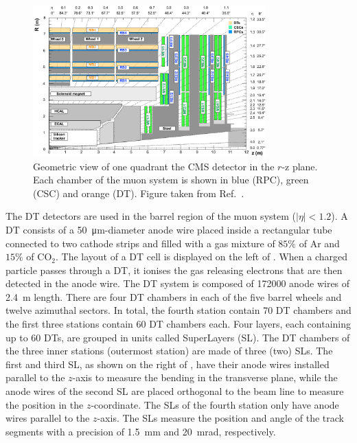 \begin{figure}[!htbp]
 \centering
 \includegraphics[width=0.8\textwidth]{Figures/Experiment/CMS/MuonSystem.png}
 \caption{Geometric view of one quadrant the CMS detector in the $r$-z plane. Each chamber of the muon system is shown in blue (RPC), green (CSC) and orange (DT). Figure taken from Ref.~\cite{CMSMuonFig}.}
 \label{fig:CMS_Muon}
\end{figure}

The DT detectors are used in the barrel region of the muon system ($|\eta| < 1.2$). A DT consists of a \SI{50}{\um}-diameter anode wire placed inside a rectangular tube connected to two cathode strips and filled with a gas mixture of $85\%$ of Ar and $15\%$ of $\text{CO}_{2}$. The layout of a DT cell is displayed on the left of . When a charged particle passes through a DT, it ionises the gas releasing electrons that are then detected in the anode wire. The DT system is composed of 172000 anode wires of \SI{2.4}{\m} length. There are four DT chambers in each of the five barrel wheels and twelve azimuthal sectors. In total, the fourth station contain 70 DT chambers and the first three stations contain 60 DT chambers each. Four layers, each containing up to 60 DTs, are grouped in units called SuperLayers (SL). The DT chambers of the three inner stations (outermost station) are made of three (two) SLs. The first and third SL, as shown on the right of , have their anode wires installed parallel to the $z$-axis to measure the bending in the transverse plane, while the anode wires of the second SL are placed orthogonal to the beam line to measure the position in the $z$-coordinate. The SLs of the fourth station only have anode wires parallel to the $z$-axis. The SLs measure the position and angle of the track segments with a precision of \SI{1.5}{\mm} and \SI{20}{\milli\radian}, respectively.

